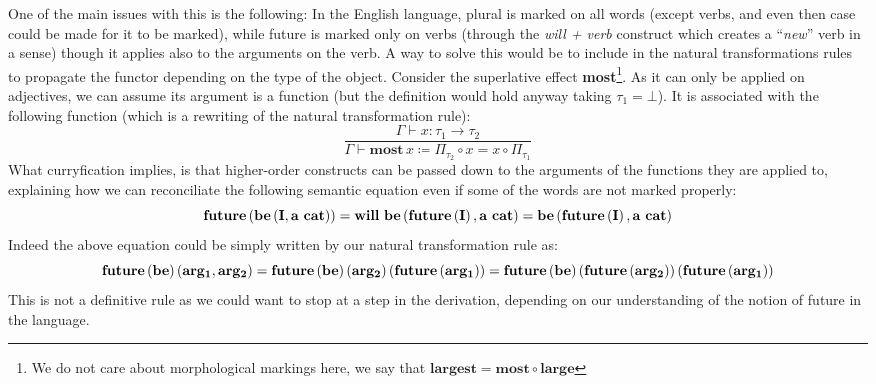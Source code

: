 \documentclass[math, english, info]{cours}
\def\cont{\Gamma\vdash}
\begin{document}
One of the main issues with this is the following:
In the English language, plural is marked on all words (except verbs, and even then case could be made for it to be marked),
while future is marked only on verbs (through the \textit{will + verb} construct which creates a ``\emph{new}'' verb in a sense) though it applies also to the arguments on the verb.
A way to solve this would be to include in the natural transformations rules to propagate the functor depending on the type of the object.
Consider the superlative effect \textbf{most}\footnote{We do not care about morphological markings here, we say that $\mathbf{largest} = \mathbf{most} \circ \mathbf{large}$}.
As it can only be applied on adjectives, we can assume its argument is a function (but the definition would hold anyway taking $\tau_{1} = \bot$).
It is associated with the following function (which is a rewriting of the natural transformation rule):
\begin{equation*}
	\frac{\cont x: \tau_{1} \to \tau_{2}}{\cont \mathbf{most}\, x \coloneqq \Pi_{\tau_{2}} \circ x = x \circ \Pi_{\tau_{1}}}
\end{equation*}
What curryfication implies, is that higher-order constructs can be passed down to the arguments of the functions they are applied to, explaining how we can reconciliate the following semantic equation even if some of the words are not marked properly:
\begin{equation*}
	\bf future\left(be\left( I, a\ cat \right)\right) = will\ be\left( future\left( I \right), a\ cat \right) = be\left( future\left( I \right), a\ cat \right)
\end{equation*}
Indeed the above equation could be simply written by our natural transformation rule as:
\begin{equation*}
	\bf future\left( be \right)\left( arg_{1}, arg_{2} \right) = future\left( be \right)\left( arg_{2} \right)\left( future\left( arg_{1} \right) \right) = future \left( be \right) \left( future \left( arg_{2} \right) \right) \left( future \left( arg_{1} \right) \right)
\end{equation*}
This is not a definitive rule as we could want to stop at a step in the derivation, depending on our understanding of the notion of future in the language.
\end{document}
